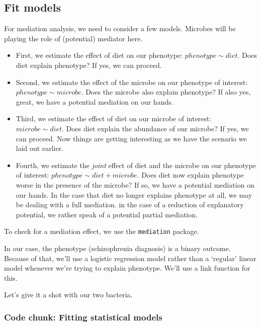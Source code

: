 \documentclass[
]{article}
\begin{document}
\newpage

\hypertarget{fit-models}{%
\subsection{Fit models}\label{fit-models}}

For mediation analysis, we need to consider a few models. Microbes will
be playing the role of (potential) mediator here.

\begin{itemize}
\item
  First, we estimate the effect of diet on our phenotype:
  \(phenotype \sim diet\). Does diet explain phenotype? If yes, we can
  proceed.
\item
  Second, we estimate the effect of the microbe on our phenotype of
  interest: \(phenotype \sim microbe\). Does the microbe also explain
  phenotype? If also yes, great, we have a potential mediation on our
  hands.
\item
  Third, we estimate the effect of diet on our microbe of interest:
  \(microbe \sim diet\). Does diet explain the abundance of our microbe?
  If yes, we can proceed. Now things are getting interesting as we have
  the scenario we laid out earlier.
\item
  Fourth, we estimate the \emph{joint} effect of diet and the microbe on
  our phenotype of interest: \(phenotype \sim diet + microbe\). Does
  diet now explain phenotype worse in the presence of the microbe? If
  so, we have a potential mediation on our hands. In the case that diet
  no longer explains phenotype at all, we may be dealing with a full
  mediation. in the case of a reduction of explanatory potential, we
  rather speak of a potential partial mediation.
\end{itemize}

To check for a mediation effect, we use the \texttt{mediation} package.

In our case, the phenotype (schizophrenia diagnosis) is a binary
outcome. Because of that, we'll use a logistic regression model rather
than a `regular' linear model whenever we're trying to explain
phenotype. We'll use a link function for this.

Let's give it a shot with our two bacteria.

\hypertarget{code-chunk-fitting-statistical-models}{%
\subsubsection{Code chunk: Fitting statistical
models}\label{code-chunk-fitting-statistical-models}}
\end{document}
